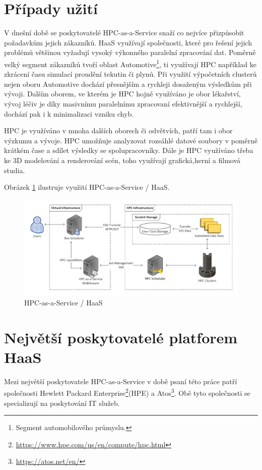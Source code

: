 \section{Případy užití}
V dnešní době se poskytovatelé HPC-as-a-Service snaží co nejvíce přizpůsobit požadavkům jejich zákazníků. HaaS využívají společnosti, které pro řešení jejich problémů většinou vyžadují vysoký výkonného paralelní zpracování dat. Poměrně velký segment zákazníků tvoří oblast Automotive\footnote{Segment automobilového průmyslu.}, ti využívají HPC například ke zkrácení času simulací proudění tekutin či plynů. Při využití výpočetních clusterů nejen oboru Automotive dochází přesnějším a rychleji dosaženým výsledkům při vývoji. Dalším oborem, ve kterém je HPC hojně využíváno je obor lékařství, vývoj léčiv je díky masivnímu paralelnímu zpracovaní efektivnější a rychlejší, dochází pak i k minimalizaci vzniku chyb.

HPC je využíváno v mnoha dalších oborech či odvětvích, patří tam i obor výzkumu a vývoje. HPC umožňuje analyzovat rozsáhlé datové soubory v poměrně krátkém čase a sdílet výsledky se spolupracovníky. Dále je HPC využíváno třeba ke 3D modelování a renderování scén, toho využívají grafická,herní a filmová studia.

Obrázek \ref{fig:haas} ilustruje využití HPC-as-a-Service / HaaS.

\begin{figure}[!h]
	\centering
	\includegraphics[width=1\textwidth]{Figures/haas.pdf}
	\caption{HPC-as-a-Service / HaaS \cite{uG7wIvjQiIli6kO9}}
	\label{fig:haas}
\end{figure}

\section{Největší poskytovatelé platforem HaaS}
Mezi největší poskytovatele HPC-as-a-Service v době psaní této práce patří společnosti Hewlett Packard Enterprise\footnote{\href{https://www.hpe.com/us/en/compute/hpc.html}{https://www.hpe.com/us/en/compute/hpc.html}}(HPE) a Atos\footnote{\href{https://atos.net/en/}{https://atos.net/en/}}. Obě tyto společnosti se specializují na poskytování IT služeb.


